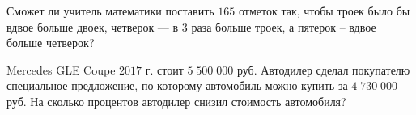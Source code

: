 \begin{listofex}
	\item Сможет ли учитель математики поставить \( 165 \) отметок так, чтобы троек было бы вдвое
	больше двоек, четверок --- в \( 3 \) раза больше троек, а пятерок – вдвое больше четверок?
	\item Mercedes GLE Coupe \( 2017 \) г. стоит \( 5\;500\;000 \) руб. Автодилер сделал покупателю специальное предложение, по которому автомобиль можно купить за \( 4\;730\;000 \) руб. На сколько процентов автодилер снизил стоимость автомобиля?
	\item {}
	\item {}
	\item {}
	\item {}
	\item {}
	\item {}
	\item {}
	\item {}
\end{listofex}
